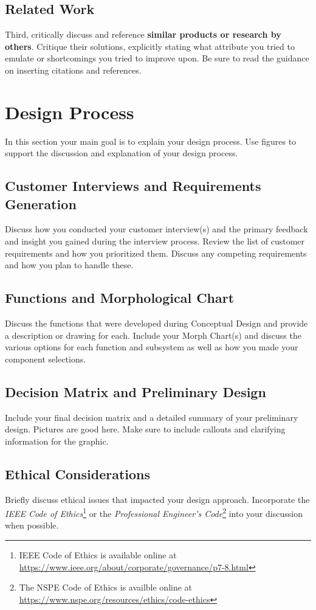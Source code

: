 \documentclass{wrcecapstone}
\begin{document}
\subsection{Related Work}
Third, critically discuss and reference \textbf{similar products or research by others}.  Critique their solutions, explicitly stating what attribute you tried to emulate or shortcomings you tried to improve upon.  Be sure to read the guidance on inserting citations and references.





\section{Design Process}
In this section your main goal is to explain your design process. Use figures to support the discussion and explanation of your design process.
 
\subsection{Customer Interviews and Requirements Generation}
Discuss how you conducted your customer interview(s) and the primary feedback and insight you gained during the interview process.  Review the list of customer requirements and how you prioritized them.  Discuss any competing requirements and how you plan to handle these.

\subsection{Functions and Morphological Chart}
Discuss the functions that were developed during Conceptual Design and provide a description or drawing for each.  Include your Morph Chart(s) and discuss the various options for each function and subsystem as well as how you made your component selections.

\subsection{Decision Matrix and Preliminary Design}
Include your final decision matrix and a detailed summary of your preliminary design.  Pictures are good here.  Make sure to include callouts and clarifying information for the graphic.

\subsection{Ethical Considerations}
Briefly discuss ethical issues that impacted your design approach.  Incorporate the \emph{IEEE Code of Ethics}\footnote{IEEE Code of Ethics is available online at \url{https://www.ieee.org/about/corporate/governance/p7-8.html}} or the \emph{Professional Engineer’s Code}\footnote{The NSPE Code of Ethics is availble online at \url{https://www.nspe.org/resources/ethics/code-ethics}} into your discussion when possible. 
\end{document}
